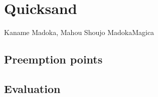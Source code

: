 \chapter{Quicksand}
\label{chap:quicksand}
{Kaname Madoka, Mahou Shoujo Madoka{\raisebox{0.1em}{$\scriptstyle \bigstar$}}Magica}


\section{Preemption points} %
\label{sec:quicksand-pps}

\section{Evaluation}
\label{sec:quicksand-eval}
